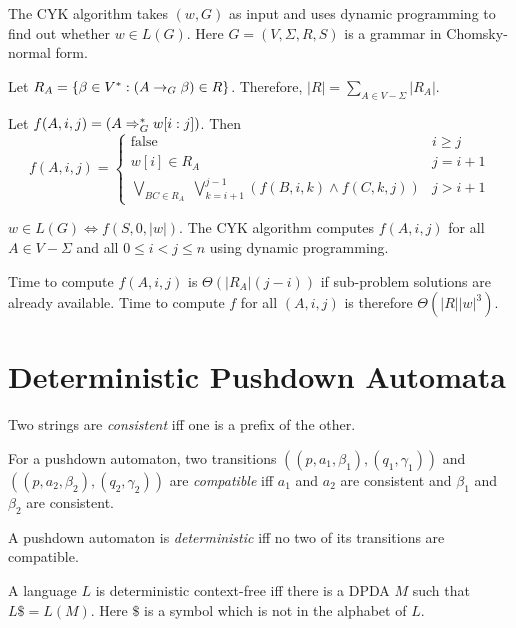 The CYK algorithm takes $(w, G)$ as input and uses dynamic programming to find out whether $w \in L(G)$.
Here $G = (V, \Sigma, R, S)$ is a grammar in Chomsky-normal form.

Let $R_A = \{\beta \in V^*: (A \rightarrow_{G} \beta) \in R\}$.
Therefore, $|R| = \sum_{A \in V-\Sigma} |R_A|$.

Let $f(A, i, j) = (A \Rightarrow_{G}^* w[i:j])$. Then
\[ f(A, i, j) = \left\{\begin{array}{cl}
\textrm{false} & i \ge j
\\ w[i] \in R_A & j = i+1
\\ \displaystyle \bigvee\limits_{BC \in R_A} \; \bigvee\limits_{k=i+1}^{j-1}
    (f(B, i, k) \wedge f(C, k, j)) & j > i+1
\end{array}\right. \]

$w \in L(G) \iff f(S, 0, |w|)$.
The CYK algorithm computes $f(A, i, j)$ for all $A \in V-\Sigma$
and all $0 \le i < j \le n$ using dynamic programming.

Time to compute $f(A, i, j)$ is $\Theta(|R_A|(j-i))$
if sub-problem solutions are already available.
Time to compute $f$ for all $(A, i, j)$ is therefore $\Theta(|R||w|^3)$.


\section{Deterministic Pushdown Automata}

\begin{definition}
Two strings are \emph{consistent} iff one is a prefix of the other.
\end{definition}
\begin{definition}
For a pushdown automaton, two transitions $((p, a_1, \beta_1), (q_1, \gamma_1))$
and $((p, a_2, \beta_2), (q_2, \gamma_2))$ are \emph{compatible} iff
$a_1$ and $a_2$ are consistent and $\beta_1$ and $\beta_2$ are consistent.
\end{definition}
\begin{definition}
A pushdown automaton is \emph{deterministic} iff no two of its transitions are compatible.
\end{definition}
\begin{definition}
A language $L$ is deterministic context-free iff there is a DPDA $M$
such that $L\$ = L(M)$. Here $\$$ is a symbol which is not in the alphabet of $L$.
\end{definition}

